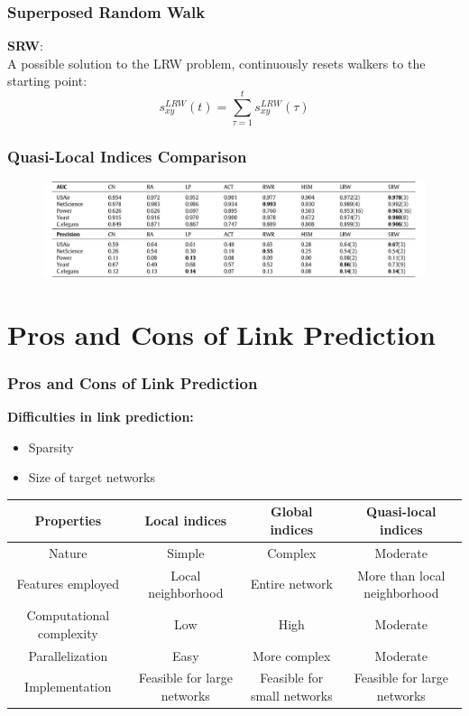 \documentclass{beamer}
\begin{document}
\begin{frame}
  \frametitle{Superposed Random Walk}
  \textbf{SRW}:\\ 
  A possible solution to the LRW problem, continuously resets walkers to the starting point: \\
  \bigskip
  \[s_{xy}^{LRW}(t) = \sum_{\tau=1}^{t}s_{xy}^{LRW}(\tau)\]
\end{frame}

\begin{frame}
\frametitle{Quasi-Local Indices Comparison}
\begin{figure}
  \centering
  \includegraphics[width=1\linewidth]{andrea_images/table2.jpg}
  \label{fig:table2}
\end{figure}
\end{frame}

\section{Pros and Cons of Link Prediction}
\begin{frame}
  \frametitle{Pros and Cons of Link Prediction}
  \textbf{Difficulties in link prediction:} 
  \begin{itemize}
      \item Sparsity  \\
      \item Size of target networks \\
  \end{itemize}
  \bigskip
  
\resizebox{10.2cm}{1.2cm}
{
\begin{tabular}{c|ccc}
\hline
    Properties & Local indices & Global indices & Quasi-local indices\\
\hline
    Nature & Simple & Complex & Moderate\\
    Features employed & Local neighborhood & Entire network & More than local neighborhood\\
    Computational complexity & Low & High & Moderate\\
    Parallelization & Easy & More complex & Moderate\\
    Implementation & Feasible for large networks & Feasible for small networks & Feasible for large networks\\
\hline
\end{tabular}
}
  
\end{frame}





\end{document}
